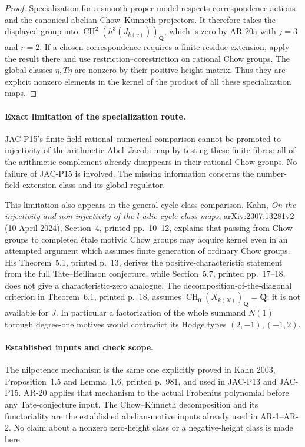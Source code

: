 \documentclass[11pt,a4paper]{article}
\begin{document}
\begin{proof}
Specialization for a smooth proper model respects correspondence
actions and the canonical abelian Chow--K\"unneth projectors.
It therefore takes the displayed group into
\(\operatorname{CH}^2(h^3(J_{k(v)}))_{\mathbf Q}\), which is zero
by AR-20a with \(j=3\) and \(r=2\). If a chosen correspondence
requires a finite residue extension, apply the result there and
use restriction--corestriction on rational Chow groups.
The global classes \(\eta,T\eta\) are nonzero by their positive
height matrix. Thus they are explicit nonzero elements in the
kernel of the product of all these specialization maps.
\end{proof}

\paragraph{Exact limitation of the specialization route.}
JAC-P15's finite-field rational--numerical comparison cannot
be promoted to injectivity of the arithmetic Abel--Jacobi map
by testing these finite fibres: all of the arithmetic complement
already disappears in their rational Chow groups. No failure of
JAC-P15 is involved. The missing information concerns the
number-field extension class and its global regulator.

This limitation also appears in the general cycle-class
comparison. Kahn, \emph{On the injectivity and non-injectivity of
the \(l\)-adic cycle class maps}, arXiv:2307.13281v2
(10 April 2024), Section~4, printed pp.~10--12, explains that
passing from Chow groups to completed \'{e}tale motivic Chow
groups may acquire kernel even in an attempted argument which
assumes finite generation of ordinary Chow groups. His
Theorem~5.1, printed p.~13, derives the positive-characteristic
statement from the full Tate--Beilinson conjecture, while
Section~5.7, printed pp.~17--18, does not give a
characteristic-zero analogue. The decomposition-of-the-diagonal
criterion in Theorem~6.1, printed p.~18, assumes
\(\operatorname{CH}_0(X_{k(X)})_{\mathbf Q}=\mathbf Q\);
it is not available for \(J\). In particular a factorization of
the whole summand \(N(1)\) through degree-one motives would
contradict its Hodge types \((2,-1),(-1,2)\).

\paragraph{Established inputs and check scope.}
The nilpotence mechanism is the same one explicitly proved in
Kahn 2003, Proposition~1.5 and Lemma~1.6, printed p.~981, and
used in JAC-P13 and JAC-P15. AR-20 applies that mechanism to
the actual Frobenius polynomial before any Tate-conjecture
input. The Chow--K\"unneth decomposition and its functoriality
are the established abelian-motive inputs already used in
AR-1--AR-2. No claim about a nonzero zero-height class or a
negative-height class is made here.
\end{document}
